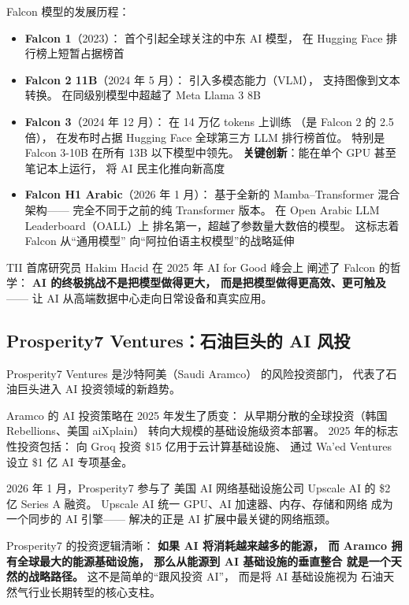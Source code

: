 Falcon 模型的发展历程：
\begin{itemize}[noitemsep]
  \item \textbf{Falcon 1}（2023）：
        首个引起全球关注的中东 AI 模型，
        在 Hugging Face 排行榜上短暂占据榜首
  \item \textbf{Falcon 2 11B}（2024 年 5 月）：
        引入多模态能力（VLM），
        支持图像到文本转换。
        在同级别模型中超越了 Meta Llama 3 8B
  \item \textbf{Falcon 3}（2024 年 12 月）：
        在 14 万亿 tokens 上训练
        （是 Falcon 2 的 2.5 倍），
        在发布时占据 Hugging Face 全球第三方 LLM
        排行榜首位。
        特别是 Falcon 3-10B 在所有 13B 以下模型中领先。
        \textbf{关键创新}：能在单个 GPU 甚至笔记本上运行，
        将 AI 民主化推向新高度
  \item \textbf{Falcon H1 Arabic}（2026 年 1 月）：
        基于全新的 Mamba--Transformer 混合架构——
        完全不同于之前的纯 Transformer 版本。
        在 Open Arabic LLM Leaderboard（OALL）上
        排名第一，超越了参数量大数倍的模型。
        这标志着 Falcon 从``通用模型''
        向``阿拉伯语主权模型''的战略延伸
\end{itemize}

TII 首席研究员 Hakim Hacid 在 2025 年 AI for Good 峰会上
阐述了 Falcon 的哲学：
\textbf{AI 的终极挑战不是把模型做得更大，
而是把模型做得更高效、更可触及}——
让 AI 从高端数据中心走向日常设备和真实应用。

\subsection{Prosperity7 Ventures：石油巨头的 AI 风投}

Prosperity7 Ventures 是沙特阿美（Saudi Aramco）
的风险投资部门，
代表了石油巨头进入 AI 投资领域的新趋势。

Aramco 的 AI 投资策略在 2025 年发生了质变：
从早期分散的全球投资（韩国 Rebellions、美国 aiXplain）
转向大规模的基础设施级资本部署。
2025 年的标志性投资包括：
向 Groq 投资 \$15 亿用于云计算基础设施、
通过 Wa'ed Ventures 设立 \$1 亿 AI 专项基金。

2026 年 1 月，Prosperity7 参与了
美国 AI 网络基础设施公司 Upscale AI 的
\$2 亿 Series A 融资。
Upscale AI 统一 GPU、AI 加速器、内存、存储和网络
成为一个同步的 AI 引擎——
解决的正是 AI 扩展中最关键的网络瓶颈。

Prosperity7 的投资逻辑清晰：
\textbf{如果 AI 将消耗越来越多的能源，
而 Aramco 拥有全球最大的能源基础设施，
那么从能源到 AI 基础设施的垂直整合
就是一个天然的战略路径。}
这不是简单的``跟风投资 AI''，
而是将 AI 基础设施视为
石油天然气行业长期转型的核心支柱。

